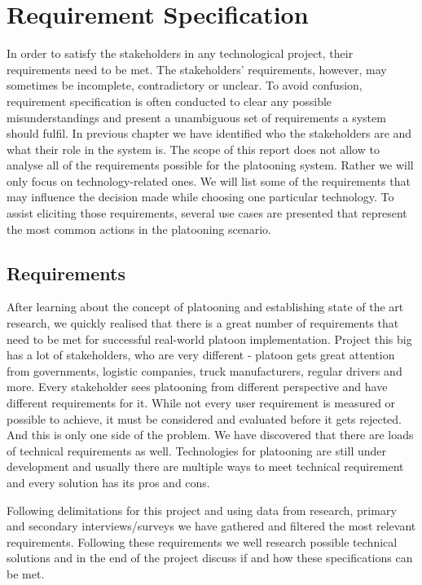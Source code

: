 \section{Requirement Specification}\label{sec:requirements}
%
In order to satisfy the stakeholders in any technological project, their requirements need to be met. The stakeholders' requirements, however, may sometimes be incomplete, contradictory or unclear. To avoid confusion, requirement specification is often conducted to clear any possible misunderstandings and present a unambiguous set of requirements a system should fulfil. In previous chapter we have identified who the stakeholders are and what their role in the system is. The scope of this report does not allow to analyse all of the requirements possible for the platooning system. Rather we will only focus on technology-related ones. We will list some of the requirements that may influence the decision made while choosing one particular technology. To assist eliciting those requirements, several use cases are presented that represent the most common actions in the platooning scenario.
%

%
\subsection{Requirements}
After learning about the concept of platooning and establishing state of the art research, we quickly realised that there is a great number of requirements that need to be met for successful real-world platoon implementation. Project this big has a lot of stakeholders, who are very different - platoon gets great attention from governments, logistic companies, truck manufacturers, regular drivers and more. Every stakeholder sees platooning from different perspective and have different requirements for it. While not every user requirement is measured or possible to achieve, it must be considered and evaluated before it gets rejected. And this is only one side of the problem. We have discovered that there are loads of technical requirements as well. Technologies for platooning are still under development and usually there are multiple ways to meet technical requirement and every solution has its pros and cons.\par
Following delimitations for this project and using data from research, primary and secondary interviews/surveys we have gathered and filtered the most relevant requirements. Following these requirements we well research possible technical solutions and in the end of the project discuss if and how these specifications can be met.\par
%
